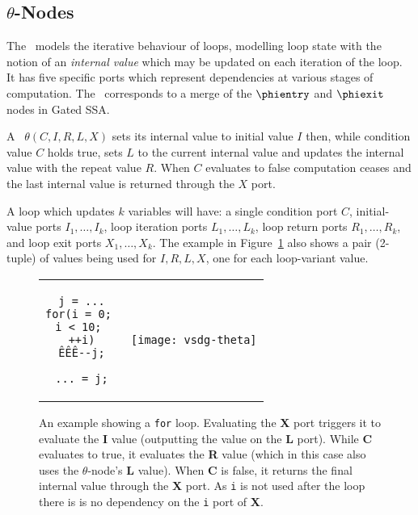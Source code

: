 
\subsection{$\theta$-Nodes}

The \Tn\ models the iterative behaviour of loops, modelling loop state with the
notion of an \emph{internal value} which may be updated on each iteration of
the loop. It has five specific ports which represent dependencies at various
stages of computation. The \Tn\ corresponds to a merge of the $\phientry$ and $\phiexit$ nodes in Gated SSA.
%

A \Tn\ $\theta(C,I,R,L,X)$ sets its internal value to initial value
$I$ then, while condition value $C$ holds true, sets $L$ to the current
internal value and updates the internal value with the repeat value $R$. When
$C$ evaluates to false computation ceases and the last internal value is
returned through the $X$ port.

%
A loop which updates $k$ variables will have:
a single condition port $C$,
initial-value ports $I_1,\ldots,I_k$,
loop iteration ports $L_1,\ldots,L_k$,
loop return ports $R_1,\ldots,R_k$, and
loop exit ports $X_1,\ldots,X_k$.
The example in Figure~\ref{fig:thetatuple} also shows a pair (2-tuple) of values being
used for $I,R,L,X$, one for each loop-variant value.


\begin{figure}[!ht]
\centering
\begin{tabular}{cc} \cline{1-1}
\begin{minipage}[c][\height][t]{0.9in}
\begin{verbatim}
j = ...
for(i = 0; 
i < 10; 
++i)
ÊÊÊ--j;
	
... = j;
\end{verbatim}
\end{minipage}
&
\begin{minipage}[c][\height][b]{3.0in}
\texttt{[image: vsdg-theta]}
\end{minipage} \\ \cline{1-1}
\end{tabular}

\caption{An example showing a \texttt{for} loop. Evaluating the \textbf{X} port triggers it to evaluate the \textbf{I} value (outputting the value on the \textbf{L} port). While \textbf{C} evaluates to true, it evaluates the \textbf{R} value (which in this case also uses the $\theta$-node's \textbf{L} value). When \textbf{C} is false, it returns the final internal value through the \textbf{X} port. As \texttt{i} is not used after the loop there is is no dependency on the \texttt{i} port of \textbf{X}.}
\label{fig:thetatuple}
\end{figure}

